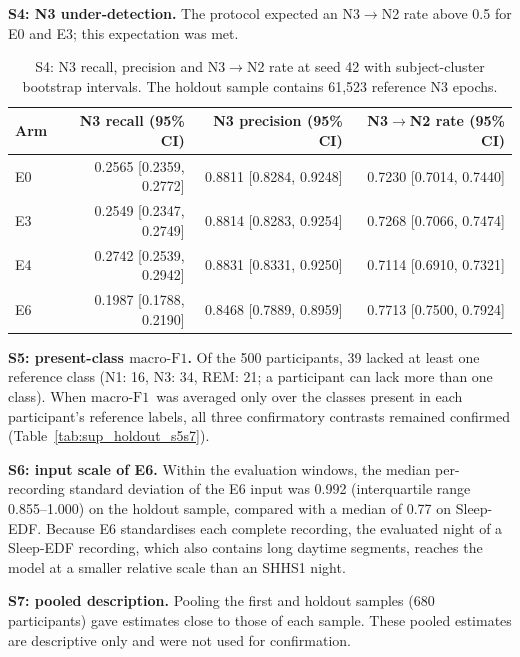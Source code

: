 \documentclass[10pt,a4paper]{article}
\newcommand{\mf}{\ensuremath{\mathrm{macro\text{-}F1}}}
\newcommand{\ci}{95\% CI}
\begin{document}
\textbf{S4: N3 under-detection.} The protocol expected an N3$\to$N2 rate above 0.5 for E0 and E3; this
expectation was met.

\begin{table}[H]
\centering\small
\caption{S4: N3 recall, precision and N3$\to$N2 rate at seed 42 with subject-cluster bootstrap
intervals. The holdout sample contains 61{,}523 reference N3 epochs.}
\label{tab:sup_holdout_s4}
\begin{tabular}{lrrr}
\toprule
Arm & N3 recall (\ci) & N3 precision (\ci) & N3$\to$N2 rate (\ci) \\
\midrule
E0 & 0.2565 [0.2359, 0.2772] & 0.8811 [0.8284, 0.9248] & 0.7230 [0.7014, 0.7440] \\
E3 & 0.2549 [0.2347, 0.2749] & 0.8814 [0.8283, 0.9254] & 0.7268 [0.7066, 0.7474] \\
E4 & 0.2742 [0.2539, 0.2942] & 0.8831 [0.8331, 0.9250] & 0.7114 [0.6910, 0.7321] \\
E6 & 0.1987 [0.1788, 0.2190] & 0.8468 [0.7889, 0.8959] & 0.7713 [0.7500, 0.7924] \\
\bottomrule
\end{tabular}
\end{table}

\textbf{S5: present-class \mf.} Of the 500 participants, 39 lacked at least one reference
class (N1: 16, N3: 34, REM: 21; a participant can lack more than one class). When \mf\ was
averaged only over the classes present in each participant's reference labels, all three confirmatory
contrasts remained confirmed (Table~\ref{tab:sup_holdout_s5s7}).

\textbf{S6: input scale of E6.} Within the evaluation windows, the median per-recording standard
deviation of the E6 input was 0.992 (interquartile range 0.855--1.000) on the holdout
sample, compared with a median of 0.77 on Sleep-EDF. Because E6 standardises each complete
recording, the evaluated night of a Sleep-EDF recording, which also contains long daytime segments,
reaches the model at a smaller relative scale than an SHHS1 night.

\textbf{S7: pooled description.} Pooling the first and holdout samples (680 participants) gave
estimates close to those of each sample. These pooled estimates are descriptive only and were not used
for confirmation.
\end{document}
